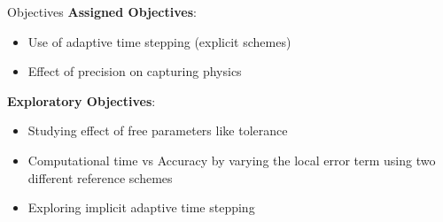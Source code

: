 \documentclass{beamer}
\begin{document}
\begin{frame}{Objectives}
\textbf{Assigned Objectives}:
\begin{itemize}
    \item Use of adaptive time stepping (explicit schemes)
    \item Effect of precision on capturing physics
\end{itemize}

\vspace*{4mm}
\textbf{Exploratory Objectives}:
\begin{itemize}
    \item Studying effect of free parameters like tolerance
    \item Computational time vs Accuracy by varying the local error term
    using two different reference schemes
    \item Exploring implicit adaptive time stepping
\end{itemize}
\end{frame}


\end{document}
